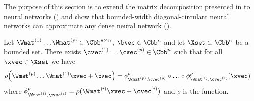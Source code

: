 The purpose of this section is to extend the matrix decomposition presented in  to neural networks () and show that bounded-width diagonal-circulant neural networks can approximate any dense neural network ().


\begin{lemma} \label{lemma:ch4-product_of_mat_to_DNN}
  Let $\Wmat^{(1)} \ldots \Wmat^{(\depth)} \in \Cbb^{n\times n}$, $\bvec \in \Cn$ and let $\Xset \subset \Cn$ be a bounded set.
  There exists $\cvec^{(1)} \ldots \cvec^{(\depth)} \in \Cn$ such that for all $\xvec \in \Xset$ we have 
  \begin{equation}
    \rho\left(\Wmat^{(\depth)} \ldots \Wmat^{(1)} \xvec + \bvec \right) = \layer^\rho_{\Wmat^{(\depth)},\cvec^{(\depth)}} \circ \ldots \circ \layer^\rho_{\Wmat^{(1)},\cvec^{(1)}}(\xvec)
  \end{equation}
  where $\layer^\rho_{\Wmat^{(i)},\cvec^{(i)}} = \rho( \Wmat^{(i)} \xvec + \cvec^{(i)} )$ and $\rho$ is the \relu function.
\end{lemma}

